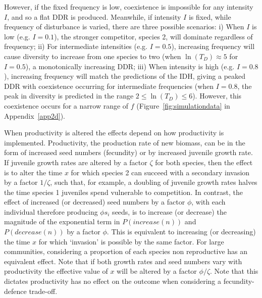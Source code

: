 \documentclass[a4paper]{article}
\begin{document}
However, if the fixed frequency is low, coexistence is impossible for any intensity $I$, and so a flat DDR is produced. Meanwhile, if intensity $I$ is fixed, while frequency of disturbance is varied, there are three possible scenarios: i) When $I$ is low (e.g. $I=0.1$), the stronger competitor, species 2, will dominate regardless of frequency; ii) For intermediate intensities (e.g. $I=0.5$), increasing frequency will cause diversity to increase from one species to two (when $\ln(T_D)\approx 5$ for $I=0.5$), a monotonically increasing DDR; iii) When intensity is high (e.g. $I=0.8$), increasing frequency will match the predictions of the IDH, giving a peaked DDR with coexistence occurring for intermediate frequencies (when $I=0.8$, the peak in diversity is predicted in the range $2\leq \ln(T_D) \leq 6$). However, this coexistence occurs for a narrow range of $f$ (Figure~\ref{fig:simulationdata} in Appendix~\ref{app2d}).

When productivity is altered the effects depend on how productivity is implemented. Productivity, the production rate of new biomass, can be in the form of increased seed numbers (fecundity) or by increased juvenile growth rate. If juvenile growth rates are altered by a factor $\zeta$ for both species, then the effect is to alter the time $x$ for which species 2 can succeed with a secondary invasion by a factor $1/\zeta$, such that, for example, a doubling of juvenile growth rates halves the time species 1 juveniles spend vulnerable to competition.  In contrast, the effect of increased (or decreased) seed numbers by a factor $\phi$, with each individual therefore producing $\phi s_i$ seeds, is to increase (or decrease) the magnitude of the exponential term in $P(increase(n))$ and $P(decrease(n))$ by a factor $\phi$. This is equivalent to increasing (or decreasing) the time $x$ for which `invasion' is possible by the same factor. For large communities, considering a proportion of each species non reproductive has an equivalent effect. Note that if both growth rates and seed numbers vary with productivity the effective value of $x$ will be altered by a factor $\phi / \zeta$. Note that this dictates productivity has no effect on the outcome when considering a fecundity-defence trade-off.
\end{document}
